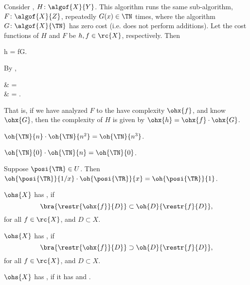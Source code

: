 \documentclass[b5paper, english, oneside]{memoir}
\begin{document}
\begin{example}
Consider , $H \colon \algof{X}{Y}$. This algorithm runs the same sub-algorithm, $F \colon \algof{X}{Z}$, repeatedly $G(x) \in \TN$ times, where the algorithm $G \colon \algof{X}{\TN}$ has zero cost (i.e. does not perform additions). Let the cost functions of $H$ and $F$ be $h, f \in \rc{X}$, respectively. Then 
\begin{eqs}
h = fG.
\end{eqs}
By ,
\begin{eqs}
 & =  \\
{} & =  \cdot {}.
\end{eqs}
That is, if we have analyzed $F$ to the have complexity $\ohx{f}$, and know $\ohx{G}$, then the complexity of $H$ is given by $\ohx{h} = \ohx{f} \cdot \ohx{G}$.
\end{example}

\begin{example}
$\oh{\TN}{n}  \cdot \oh{\TN}{n^2} = \oh{\TN}{n^3}$.
\end{example}

\begin{example}
$\oh{\TN}{0}  \cdot \oh{\TN}{n} = \oh{\TN}{0}$.
\end{example}

\begin{example}
Suppose $\posi{\TR} \in U$. Then $\oh{\posi{\TR}}{1/x}  \cdot \oh{\posi{\TR}}{x} = \oh{\posi{\TR}}{1}$.
\end{example}

\begin{definition}
$\ohs{X}$ has , if
\begin{equation}
\bra{\restr{\ohx{f}}{D}} \subset \oh{D}{\restr{f}{D}},
\end{equation}
for all $f \in \rc{X}$, and $D \subset X$.
\end{definition}

\begin{definition}
$\ohs{X}$ has , if
\begin{equation}
\bra{\restr{\ohx{f}}{D}} \supset \oh{D}{\restr{f}{D}},
\end{equation}
for all $f \in \rc{X}$, and $D \subset X$.
\end{definition}

\begin{definition}
$\ohs{X}$ has , if it has  and .
\end{definition}
\end{document}
